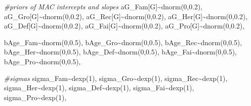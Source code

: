 \documentclass[
]{book}
\newenvironment{Shaded}{\begin{snugshade}}{\end{snugshade}}
\newcommand{\CommentTok}[1]{\textcolor[rgb]{0.56,0.35,0.01}{\textit{#1}}}
\newcommand{\DecValTok}[1]{\textcolor[rgb]{0.00,0.00,0.81}{#1}}
\newcommand{\FloatTok}[1]{\textcolor[rgb]{0.00,0.00,0.81}{#1}}
\newcommand{\FunctionTok}[1]{\textcolor[rgb]{0.00,0.00,0.00}{#1}}
\newcommand{\NormalTok}[1]{#1}
\newcommand{\SpecialCharTok}[1]{\textcolor[rgb]{0.00,0.00,0.00}{#1}}
\begin{document}
\begin{Shaded}
\begin{Highlighting}[]
    \CommentTok{\#priors of MAC intercepts and slopes}
\NormalTok{    aG\_Fam[G]}\SpecialCharTok{\textasciitilde{}}\FunctionTok{dnorm}\NormalTok{(}\DecValTok{0}\NormalTok{,}\FloatTok{0.2}\NormalTok{),}
\NormalTok{    aG\_Gro[G]}\SpecialCharTok{\textasciitilde{}}\FunctionTok{dnorm}\NormalTok{(}\DecValTok{0}\NormalTok{,}\FloatTok{0.2}\NormalTok{),}
\NormalTok{    aG\_Rec[G]}\SpecialCharTok{\textasciitilde{}}\FunctionTok{dnorm}\NormalTok{(}\DecValTok{0}\NormalTok{,}\FloatTok{0.2}\NormalTok{),}
\NormalTok{    aG\_Her[G]}\SpecialCharTok{\textasciitilde{}}\FunctionTok{dnorm}\NormalTok{(}\DecValTok{0}\NormalTok{,}\FloatTok{0.2}\NormalTok{),}
\NormalTok{    aG\_Def[G]}\SpecialCharTok{\textasciitilde{}}\FunctionTok{dnorm}\NormalTok{(}\DecValTok{0}\NormalTok{,}\FloatTok{0.2}\NormalTok{),}
\NormalTok{    aG\_Fai[G]}\SpecialCharTok{\textasciitilde{}}\FunctionTok{dnorm}\NormalTok{(}\DecValTok{0}\NormalTok{,}\FloatTok{0.2}\NormalTok{),}
\NormalTok{    aG\_Pro[G]}\SpecialCharTok{\textasciitilde{}}\FunctionTok{dnorm}\NormalTok{(}\DecValTok{0}\NormalTok{,}\FloatTok{0.2}\NormalTok{),}
    
\NormalTok{    bAge\_Fam}\SpecialCharTok{\textasciitilde{}}\FunctionTok{dnorm}\NormalTok{(}\DecValTok{0}\NormalTok{,}\FloatTok{0.5}\NormalTok{),}
\NormalTok{    bAge\_Gro}\SpecialCharTok{\textasciitilde{}}\FunctionTok{dnorm}\NormalTok{(}\DecValTok{0}\NormalTok{,}\FloatTok{0.5}\NormalTok{),}
\NormalTok{    bAge\_Rec}\SpecialCharTok{\textasciitilde{}}\FunctionTok{dnorm}\NormalTok{(}\DecValTok{0}\NormalTok{,}\FloatTok{0.5}\NormalTok{),}
\NormalTok{    bAge\_Her}\SpecialCharTok{\textasciitilde{}}\FunctionTok{dnorm}\NormalTok{(}\DecValTok{0}\NormalTok{,}\FloatTok{0.5}\NormalTok{),}
\NormalTok{    bAge\_Def}\SpecialCharTok{\textasciitilde{}}\FunctionTok{dnorm}\NormalTok{(}\DecValTok{0}\NormalTok{,}\FloatTok{0.5}\NormalTok{),}
\NormalTok{    bAge\_Fai}\SpecialCharTok{\textasciitilde{}}\FunctionTok{dnorm}\NormalTok{(}\DecValTok{0}\NormalTok{,}\FloatTok{0.5}\NormalTok{),}
\NormalTok{    bAge\_Pro}\SpecialCharTok{\textasciitilde{}}\FunctionTok{dnorm}\NormalTok{(}\DecValTok{0}\NormalTok{,}\FloatTok{0.5}\NormalTok{),}
    
    \CommentTok{\#sigmas}
\NormalTok{    sigma\_Fam}\SpecialCharTok{\textasciitilde{}}\FunctionTok{dexp}\NormalTok{(}\DecValTok{1}\NormalTok{),}
\NormalTok{    sigma\_Gro}\SpecialCharTok{\textasciitilde{}}\FunctionTok{dexp}\NormalTok{(}\DecValTok{1}\NormalTok{),}
\NormalTok{    sigma\_Rec}\SpecialCharTok{\textasciitilde{}}\FunctionTok{dexp}\NormalTok{(}\DecValTok{1}\NormalTok{),}
\NormalTok{    sigma\_Her}\SpecialCharTok{\textasciitilde{}}\FunctionTok{dexp}\NormalTok{(}\DecValTok{1}\NormalTok{),}
\NormalTok{    sigma\_Def}\SpecialCharTok{\textasciitilde{}}\FunctionTok{dexp}\NormalTok{(}\DecValTok{1}\NormalTok{),}
\NormalTok{    sigma\_Fai}\SpecialCharTok{\textasciitilde{}}\FunctionTok{dexp}\NormalTok{(}\DecValTok{1}\NormalTok{),}
\NormalTok{    sigma\_Pro}\SpecialCharTok{\textasciitilde{}}\FunctionTok{dexp}\NormalTok{(}\DecValTok{1}\NormalTok{),}
    

\end{Highlighting}
\end{Shaded}
\end{document}
